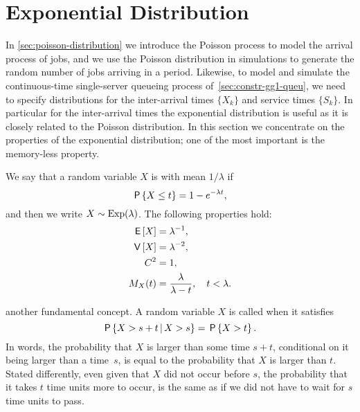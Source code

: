 


\section{Exponential Distribution}
\label{sec:expon-distr}

In \cref{sec:poisson-distribution} we introduce the Poisson process to model the arrival process of jobs, and we use the Poisson distribution in simulations to generate the random number of jobs arriving in a period.
Likewise, to model and simulate the continuous-time single-server queueing process of~\cref{sec:constr-gg1-queu}, we need to specify distributions for the inter-arrival times $\{X_k\}$ and service times $\{S_k\}$.
In particular for the inter-arrival times the exponential distribution is useful as it is closely related to the Poisson distribution.
In this section we concentrate on the properties of the  exponential distribution; one of the most important is the memory-less property.




We say that a random variable $X$ is  with mean $1/\lambda$ if
\begin{equation*}
 \P{X \leq t} = 1- e^{-\lambda t},
\end{equation*}
and then we write $X\sim \Exp(\lambda)$. The following properties hold:
\begin{subequations}
  \begin{align}
  \E X &= \lambda^{-1},   \label{eq:24}\\
\V X &= \lambda^{-2}, \label{eq:26}\\
    C^2&= 1, \label{eq:27}\\
 M_X(t) &= \frac{\lambda}{\lambda-t}, \quad t<\lambda.\label{eq:30}
\end{align}
\end{subequations}


 another fundamental concept.
A random variable $X$ is called  when it satisfies
\begin{equation*}
 \P{X > s+t \given X>s} = \P{X>t}.
\end{equation*}
In words, the probability that $X$ is larger than some time $s+t$, conditional on it being larger than a time~$s$, is equal to the probability that $X$ is larger than $t$.
Stated differently, even given that $X$ did not occur before $s$, the probability that it takes $t$ time units more to occur, is the same as if we did not have to wait for $s$ time units to pass.


